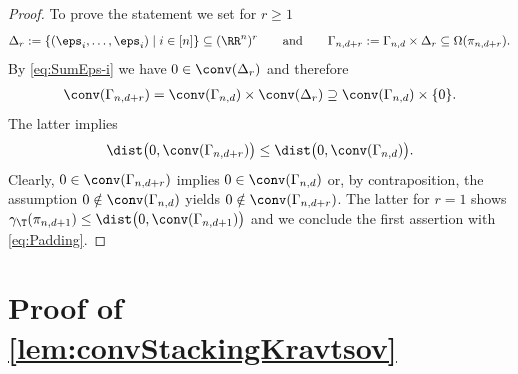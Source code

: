 \begin{proof}
To prove the statement we set for $r \geq 1 $
	\[ \Delta_r := \{ (\eps_i,\ldots,\eps_i) \mid i \in [n] \} \subseteq (\RR^n)^r \qquad \text{and} \qquad
	\Gamma_{n,d+r} := \Gamma_{n,d} \times \Delta_r \subseteq \Omega(\pi_{n,d+r}) . \]
By \cref{eq:SumEps-i} we have $0 \in \conv(\Delta_r)$ and therefore
	\begin{align*}
	\conv(\Gamma_{n,d+r}) = \conv(\Gamma_{n,d}) \times \conv(\Delta_r)
	\supseteq \conv(\Gamma_{n,d}) \times \{0\}.
	\end{align*}
The latter implies
	\begin{equation}\label{eq:Padding}
	\dist \big( 0, \conv(\Gamma_{n,d+r}) \big) \leq \dist \big( 0, \conv(\Gamma_{n,d}) \big).
	\end{equation}
Clearly, $0 \in \conv(\Gamma_{n,d+r})$ implies $0 \in \conv(\Gamma_{n,d})$ or, by contraposition, the assumption $0 \notin \conv(\Gamma_{n,d})$ yields $0 \notin \conv(\Gamma_{n,d+r})$. The latter for $r=1$ shows $\gamma_{\T}(\pi_{n,d+1}) \leq \dist \big(0, \conv(\Gamma_{n,d + 1}) \big)$ and we conclude the first assertion with \cref{eq:Padding}.
\end{proof}

























\setcounter{section}{3}\section{Proof of \cref{lem:convStackingKravtsov}}\label{sec:StackingKravtsovGeneral}

